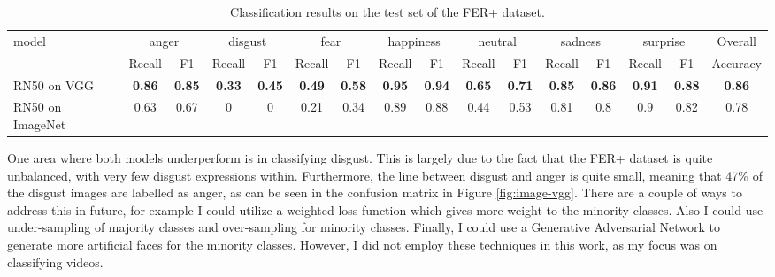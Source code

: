 \documentclass[sigconf]{acmart}
\begin{document}
{\begin{table}[htbp]
\caption{Classification results on the test set of the FER+ dataset.}
\label{tab:imageres}
\begin{tabular}{lccccccccccccccc}
\multirow{2}{*}{model} & \multicolumn{2}{c}{anger} &
\multicolumn{2}{c}{disgust} & \multicolumn{2}{c}{fear} &
\multicolumn{2}{c}{happiness} & \multicolumn{2}{c}{neutral} &
\multicolumn{2}{c}{sadness} & \multicolumn{2}{c}{surprise}  & Overall\\ \cline{2-16}
                       & Recall        & F1        
		       & Recall        & F1        & Recall        & F1
		       &  Recall        & F1        &  Recall        & F1
		       & Recall        & F1        & Recall        & F1    &
		       Accuracy    \\ \hline
RN50 on VGG & \textbf{0.86} &\textbf{0.85} &\textbf{0.33} &\textbf{0.45} &\textbf{0.49} &\textbf{0.58} &\textbf{0.95} &\textbf{0.94} &\textbf{0.65} &\textbf{0.71} &\textbf{0.85} &\textbf{0.86} &\textbf{0.91} &\textbf{0.88} &\textbf{0.86} \\
RN50 on ImageNet   & 0.63 &0.67 &0 &0 &0.21 &0.34 &0.89 &0.88 &0.44 &0.53 &0.81 &0.8 &0.9 &0.82 &0.78 \\
\end{tabular}
\end{table}

One area where both models underperform is in classifying disgust. This is largely
due to the fact that the FER+ dataset is quite unbalanced, with very few
disgust expressions within. Furthermore, the line between disgust and anger is
quite small, meaning that 47\% of the disgust images are labelled as
anger,
as can be seen in the confusion matrix in Figure \ref{fig:image-vgg}. There
are a couple of ways to address this in future, for example I could utilize a
weighted loss function which gives more weight to the minority
classes. Also I could use under-sampling of majority classes and over-sampling
for minority classes. Finally, I could use a Generative
Adversarial Network to generate more artificial faces for the minority
classes. However, I did not employ these techniques in this work, as my focus
was on classifying videos.

}
\end{document}

